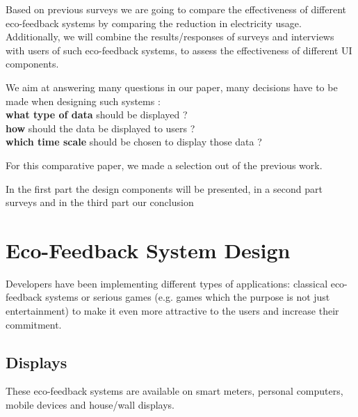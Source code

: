 \documentclass[journal]{vgtc}                %
\begin{document}
Based on previous surveys we are going to compare the effectiveness of different eco-feedback systems by comparing the reduction in electricity usage. Additionally, we will combine the results/responses of surveys and interviews with users of such eco-feedback systems, to assess the effectiveness of different UI components. 

We aim at answering many questions in our paper, many decisions have to be made when designing such systems : \\
\textbf{what type of data} should be displayed ? \\
\textbf{how} should the data be displayed to users ? \\
\textbf{which time scale} should be chosen to display those data ? 

For this comparative paper, we made a selection out of the previous work. 

In the first part the design components will be presented, in a second part surveys and in the third part our conclusion %


\section{Eco-Feedback System Design}
Developers have been implementing different types of applications: classical eco-feedback systems or serious games (e.g. games which the purpose is not just entertainment) %
to make it even more attractive to the users and increase their commitment.

\subsection{Displays}
These eco-feedback systems are available on smart meters, personal computers, mobile devices and house/wall displays. %
\end{document}
